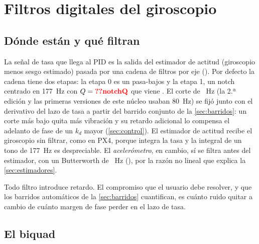 \section{Filtros digitales del giroscopio}
\label{sec:filtros}

\subsection{Dónde están y qué filtran}

La señal de tasa que llega al PID es la salida del estimador de actitud
(giroscopio menos sesgo estimado) pasada por una cadena de filtros por eje
(). Por defecto la cadena tiene dos etapas:
la etapa 0 es un pasa-bajos  y la etapa 1, un notch centrado en
177~Hz con $Q=\val{notchQ}$ que viene . El corte de
~Hz (la 2.ª edición y las primeras versiones de este núcleo
usaban 80~Hz) se fijó junto con el derivativo del lazo de tasa a partir del
barrido conjunto de la \cref{sec:barridos}: un corte más bajo quita más
vibración y su retardo adicional lo compensa el adelanto de fase de un $k_d$
mayor (\cref{sec:control}). El estimador de actitud recibe el giroscopio
sin filtrar, como en PX4, porque integra la tasa y la integral de un tono de
177~Hz es despreciable. El \emph{acelerómetro}, en cambio, sí se filtra antes
del estimador, con un Butterworth de ~Hz
(), por la razón no lineal que explica
la \cref{sec:estimadores}.

Todo filtro introduce retardo. El compromiso que el usuario debe resolver,
y que los barridos automáticos de la \cref{sec:barridos} cuantifican, es
cuánto ruido quitar a cambio de cuánto margen de fase perder en el lazo de
tasa.

\subsection{El biquad}

